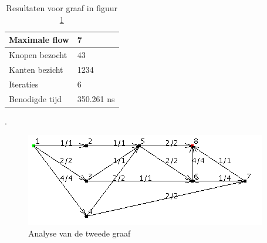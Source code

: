 \begin{table}[h]
 \begin{tabularx}{\linewidth}{| l | X |}
 \hline
 Maximale flow & 7 \\
 \hline
 Knopen bezocht & 43 \\
 \hline
 Kanten bezicht & 1234 \\
 \hline
 Iteraties & 6 \\
 \hline
 Benodigde tijd & 350.261 ns \\
 \hline
\end{tabularx}
\centering
\caption{Resultaten voor graaf in figuur \ref{fig:DFSgraph2}}.
\label{tbl:DFSgraph2}
\end{table}

\begin{figure}[h]
	\includegraphics{depthfirst/DFSgraph2}
	\centering
	\caption{Analyse van de tweede graaf}
	\label{fig:DFSgraph2}
\end{figure}

